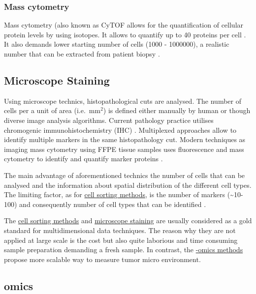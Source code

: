 \documentclass[12pt,]{book}
\theoremstyle{definition}
\theoremstyle{definition}
\theoremstyle{definition}
\theoremstyle{remark}
\begin{document}
\hypertarget{mass-cytometry}{%
\subsubsection{Mass cytometry}\label{mass-cytometry}}

Mass cytometry (also known as CyTOF allows for the quantification of
cellular protein levels by using isotopes. It allows to quantify up to
40 proteins per cell \citep{Papalexi2017}. It also demands lower
starting number of cells (1000 - 1000000), a realistic number that can
be extracted from patient biopsy \citep{Lyons2017}.

\hypertarget{staining}{%
\subsection{Microscope Staining}\label{staining}}

Using microscope technics, histopathological cuts are analysed. The
number of cells per a unit of area (i.e.~mm\(^2\)) is defined either
manually by human or though diverse image analysis algorithms. Current
pathology practice utilises chromogenic immunohistochemistry (IHC)
\citep{RamosVara2010}. Multiplexed approaches allow to identify multiple
markers in the same histopathology cut. Modern techniques as imaging
mass cytometry using FFPE tissue samples uses fluorescence and mass
cytometry to identify and quantify marker proteins \citep{Giesen2014}.

The main advantage of aforementioned technics the number of cells that
can be analysed and the information about spatial distribution of the
different cell types. The limiting factor, as for
\protect\hyperlink{facs}{cell sorting methods}, is the number of markers
(\textasciitilde{}10-100) and consequently number of cell types that can
be identified \citep{Schelker2017}.

The \protect\hyperlink{facs}{cell sorting methods} and
\protect\hyperlink{staining}{microscope staining} are usually considered
as a gold standard for multidimensional data techniques. The reason why
they are not applied at large scale is the cost but also quite laborious
and time consuming sample preparation demanding a fresh sample. In
contrast, the \protect\hyperlink{omics}{-omics methods} propose more
scalable way to measure tumor micro environment.

\hypertarget{omics}{%
\subsection{omics}\label{omics}}
\end{document}
